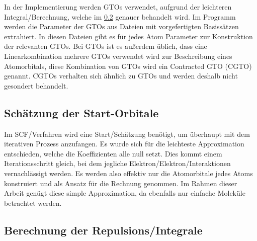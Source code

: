 In der Implementierung werden GTOs verwendet, aufgrund der leichteren Integral\-/Berechnung,
welche im \cref{repulsion-integrals-section} genauer behandelt wird.
Im Programm werden die Parameter der GTOs aus Dateien mit vorgefertigten Basissätzen extrahiert.
In diesen Dateien gibt es für jedes Atom Parameter zur Konstruktion der relevanten GTOs.
Bei GTOs ist es außerdem üblich, dass eine Linearkombination mehrere GTOs verwendet wird 
zur Beschreibung eines Atomorbitals, diese Kombination von GTOs wird ein Contracted GTO (CGTO) genannt.
CGTOs verhalten sich ähnlich zu GTOs und werden deshalb nicht gesondert behandelt.

\subsection{Schätzung der Start-Orbitale}
Im SCF\-/Verfahren wird eine Start\-/Schätzung benötigt, um überhaupt mit dem iterativen Prozess anzufangen.
Es wurde sich für die leichteste Approximation entschieden, welche die Koeffizienten alle null setzt.
Dies kommt einem Iterationsschritt gleich,
bei dem jegliche Elektron\-/Elektron\-/Interaktionen vernachlässigt werden.
Es werden also effektiv nur die Atomorbitale jedes Atoms konstruiert
und als Ansatz für die Rechnung genommen. Im Rahmen dieser Arbeit genügt diese simple Approximation,
da ebenfalls nur einfache Moleküle betrachtet werden.

\subsection{Berechnung der Repulsions\-/Integrale}\label{repulsion-integrals-section}
